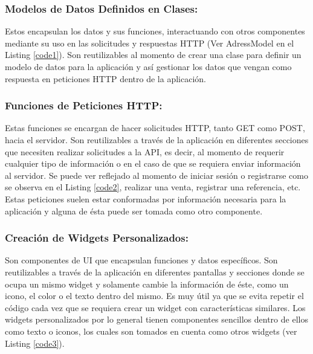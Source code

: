 \documentclass[runningheads]{llncs}
\begin{document}
\subsubsection*{Modelos de Datos Definidos en Clases:}
Estos encapsulan los datos y sus funciones, interactuando con otros componentes mediante su uso en las solicitudes y respuestas HTTP (Ver AdressModel en el Listing \ref{code1}). Son reutilizables al momento de crear una clase para definir un modelo de datos para la aplicación y así gestionar los datos que vengan como respuesta en peticiones HTTP dentro de la aplicación.


\subsubsection*{Funciones de Peticiones HTTP:}
Estas funciones se encargan de hacer solicitudes HTTP, tanto GET como POST, hacia el servidor. Son reutilizables a través de la aplicación en diferentes secciones que necesiten realizar solicitudes a la API, es decir, al momento de requerir cualquier tipo de información o en el caso de que se requiera enviar información al servidor. Se puede ver reflejado al momento de iniciar sesión o registrarse como se observa en el Listing \ref{code2}, realizar una venta, registrar una referencia, etc. Estas peticiones suelen estar conformadas por información necesaria para la aplicación y alguna de ésta puede ser tomada como otro componente.


\subsubsection*{Creación de Widgets Personalizados:}
Son componentes de UI que encapsulan funciones y datos específicos. Son reutilizables a través de la aplicación en diferentes pantallas y secciones donde se ocupa un mismo widget y solamente cambie la información de éste, como un icono, el color o el texto dentro del mismo. Es muy útil ya que se evita repetir el código cada vez que se requiera crear un widget con características similares. Los widgets personalizados por lo general tienen componentes sencillos dentro de ellos como texto o iconos, los cuales son tomados en cuenta como otros widgets (ver Listing \ref{code3}).

\end{document}

